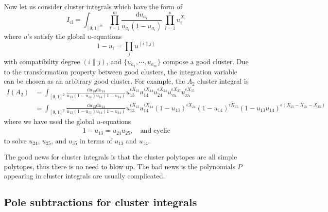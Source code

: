 \documentclass[12pt]{article}
\theoremstyle{definition}
\theoremstyle{plain}
\newcommand{\dif}{\mathrm{d}} %
\begin{document}
Now let us consider cluster integrals which have the form of 
\begin{equation}
    I_{\text{cl}}=\int_{[0,1]^{m}} \prod_{i=1}^{m}\frac{\dif u_{a_{i}}}{u_{a_{i}}(1-u_{a_{i}})} \:\prod_{i=1}^{n} u_{i}^{X_{i}} 
    \label{gencint} 
\end{equation}
where $u$'s satisfy the global $u$-equations
\[
  1-u_{i}=\prod_{j}u^{(i\parallel j)}    
\]
with compatibility degree $(i\parallel j)$, and $\{u_{a_{1}},\cdots,u_{a_{m}}\}$ compose a good cluster. Due to the transformation property between good clusters, the integration variable can be chosen as an arbitrary good cluster. For example, the $A_{2}$ cluster integral is
\begin{align*}
    I({A_{2}})&=\int_{[0,1]^{2}} \frac{ \dif u_{13}\dif u_{14}}{u_{13}(1-u_{13})u_{14}(1-u_{14})}u_{13}^{\epsilon X_{13}} u_{14}^{\epsilon X_{14}} u_{24}^{\epsilon X_{24}} u_{25}^{\epsilon X_{25}} u_{35}^{\epsilon X_{35}} \\
    &=\int_{[0,1]^{2}} \frac{ \dif u_{13}\dif u_{14}}{u_{13}(1-u_{13})u_{14}(1-u_{14})}u_{13}^{\epsilon X_{13}} u_{14}^{\epsilon X_{14}} (1-u_{13})^{\epsilon X_{24}}   (1-u_{14})^{\epsilon X_{35}} (1-u_{13}u_{14})^{\epsilon(X_{25}-X_{24}-X_{35})} 
\end{align*}
where we have used the global $u$-equations 
\begin{align*}
    1-u_{13}=u_{24} u_{25}, \quad \text{and cyclic}
\end{align*}
to solve $u_{24}$, $u_{25}$, and $u_{35}$ in terms of $u_{13}$ and $u_{14}$. 


The good news for cluster integrals is that the cluster polytopes are all simple polytopes, thus there is no need to blow up. The bad news is the polynomials $P$ appearing in cluster integrals are usually complicated.


\subsection{Pole subtractions for cluster integrals}
\end{document}
